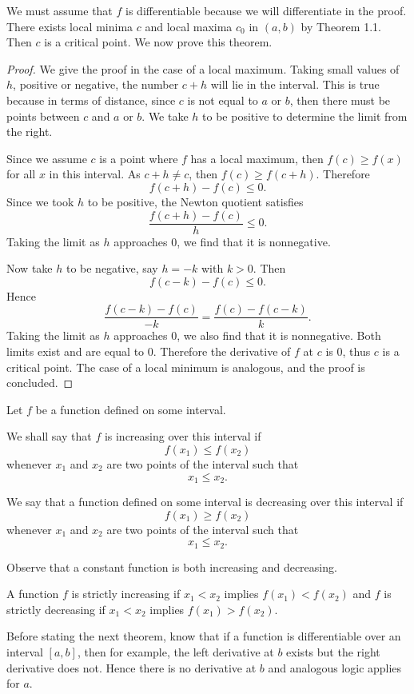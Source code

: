 We must assume that $f$ is differentiable because we will differentiate in the proof. There exists local minima $c$ and local maxima $c_0$ in $(a,b)$ by Theorem 1.1. Then $c$ is a critical point. We now prove this theorem.

\begin{proof}
  We give the proof in the case of a local maximum. Taking small values of $h$, positive or negative, the number $c + h$ will lie in the interval. This is true because in terms of distance, since $c$ is not equal to $a$ or $b$, then there must be points between $c$ and $a$ or $b$. We take $h$ to be positive to determine the limit from the right.

  Since we assume $c$ is a point where $f$ has a local maximum, then $f(c) \ge f(x)$ for all $x$ in this interval. As $c + h \ne c$, then $f(c) \ge f(c + h)$. Therefore
  \[f(c + h) - f(c) \le 0.\]
  Since we took $h$ to be positive, the Newton quotient satisfies
  \[\frac{f(c + h) - f(c)}{h} \le 0.\]
  Taking the limit as $h$ approaches $0$, we find that it is nonnegative.

  Now take $h$ to be negative, say $h = -k$ with $k > 0$. Then
  \[f(c - k) - f(c) \le 0.\]
  Hence
  \[\frac{f(c - k) - f(c)}{-k} = \frac{f(c) - f(c - k)}{k}.\]
  Taking the limit as $h$ approaches $0$, we also find that it is nonnegative. Both limits exist and are equal to $0$. Therefore the derivative of $f$ at $c$ is $0$, thus $c$ is a critical point. The case of a local minimum is analogous, and the proof is concluded.
\end{proof}

Let $f$ be a function defined on some interval.

\begin{definition}
  We shall say that $f$ is increasing over this interval if
  \[f(x_1) \le f(x_2)\]
  whenever $x_1$ and $x_2$ are two points of the interval such that
  \[x_1 \le x_2.\]
\end{definition}

We say that a function defined on some interval is decreasing over this interval if
\[f(x_1) \ge f(x_2)\]
whenever $x_1$ and $x_2$ are two points of the interval such that
\[x_1 \le x_2.\]

Observe that a constant function is both increasing and decreasing.

A function $f$ is strictly increasing if $x_1 < x_2$ implies $f(x_1) < f(x_2)$ and $f$ is strictly decreasing if $x_1 < x_2$ implies $f(x_1) > f(x_2)$.

Before stating the next theorem, know that if a function is differentiable over an interval $[a,b]$, then for example, the left derivative at $b$ exists but the right derivative does not. Hence there is no derivative at $b$ and analogous logic applies for $a$.

